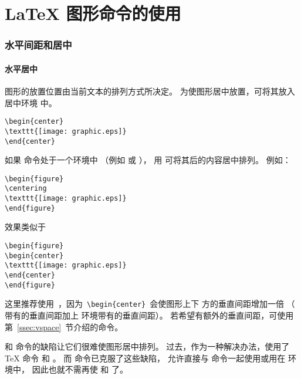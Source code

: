 
\part{\LaTeX{} 图形命令的使用}

\section{水平间距和居中}\label{sec:center}

\subsection{水平居中}\label{ssec:hcenter}
图形的放置位置由当前文本的排列方式所决定。
为使图形居中放置，可将其放入居中环境  中。
\begin{lstlisting}
\begin{center}
\texttt{[image: graphic.eps]}
\end{center}
\end{lstlisting}

如果  命令处于一个环境中
（例如  或 ），
用  可将其后的内容居中排列。
例如：

\begin{lstlisting}
\begin{figure}
\centering
\texttt{[image: graphic.eps]}
\end{figure}
\end{lstlisting}
效果类似于
\begin{lstlisting}
\begin{figure}
\begin{center}
\texttt{[image: graphic.eps]}
\end{center}
\end{figure}
\end{lstlisting}
这里推荐使用~，因为~\verb+\begin{center}+~会使图形上下
方的垂直间距增加一倍
（  带有的垂直间距加上  环境带有的垂直间距）。
若希望有额外的垂直间距，可使用第~\ref{ssec:vspace}~节介绍的命令。

 和  命令的缺陷让它们很难使图形居中排列。
过去，作为一种解决办法，使用了 \TeX{} 命令  和 。
而  命令已克服了这些缺陷，
允许直接与  命令一起使用或用在  环境中，
因此也就不需再使  和 了。

